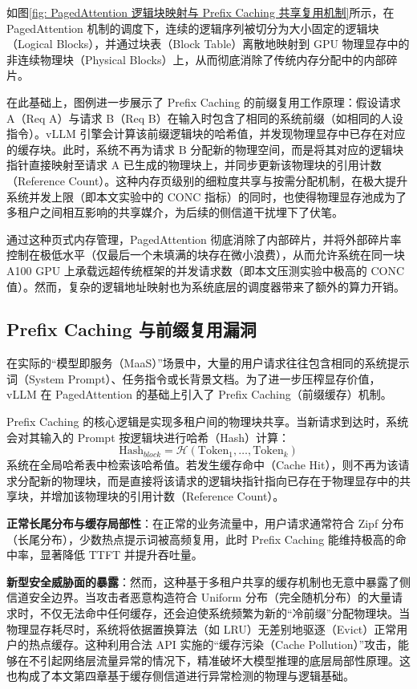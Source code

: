 \documentclass[master, vlined]{DissertUESTC}
\begin{document}
	如图\ref{fig: PagedAttention 逻辑块映射与 Prefix Caching 共享复用机制}所示，在 PagedAttention 机制的调度下，连续的逻辑序列被切分为大小固定的逻辑块（Logical Blocks），并通过块表（Block Table）离散地映射到 GPU 物理显存中的非连续物理块（Physical Blocks）上，从而彻底消除了传统内存分配中的内部碎片。

	在此基础上，图例进一步展示了 Prefix Caching 的前缀复用工作原理：假设请求 A（Req A）与请求 B（Req B）在输入时包含了相同的系统前缀（如相同的人设指令）。vLLM 引擎会计算该前缀逻辑块的哈希值，并发现物理显存中已存在对应的缓存块。此时，系统不再为请求 B 分配新的物理空间，而是将其对应的逻辑块指针直接映射至请求 A 已生成的物理块上，并同步更新该物理块的引用计数（Reference Count）。这种内存页级别的细粒度共享与按需分配机制，在极大提升系统并发上限（即本文实验中的 CONC 指标）的同时，也使得物理显存池成为了多租户之间相互影响的共享媒介，为后续的侧信道干扰埋下了伏笔。

	通过这种页式内存管理，PagedAttention 彻底消除了内部碎片，并将外部碎片率控制在极低水平（仅最后一个未填满的块存在微小浪费），从而允许系统在同一块 A100 GPU 上承载远超传统框架的并发请求数（即本文压测实验中极高的 CONC 值）。然而，复杂的逻辑地址映射也为系统底层的调度器带来了额外的算力开销。

	\subsection{Prefix Caching 与前缀复用漏洞}
	在实际的“模型即服务（MaaS）”场景中，大量的用户请求往往包含相同的系统提示词（System Prompt）、任务指令或长背景文档。为了进一步压榨显存价值，vLLM 在 PagedAttention 的基础上引入了 Prefix Caching（前缀缓存）机制。

	Prefix Caching 的核心逻辑是实现多租户间的物理块共享。当新请求到达时，系统会对其输入的 Prompt 按逻辑块进行哈希（Hash）计算：
	\begin{equation}
		\text{Hash}_{block} = \mathcal{H}(\text{Token}_1, \dots, \text{Token}_k)
	\end{equation}
	系统在全局哈希表中检索该哈希值。若发生缓存命中（Cache Hit），则不再为该请求分配新的物理块，而是直接将该请求的逻辑块指针指向已存在于物理显存中的共享块，并增加该物理块的引用计数（Reference Count）。

	\textbf{正常长尾分布与缓存局部性}：在正常的业务流量中，用户请求通常符合 Zipf 分布（长尾分布），少数热点提示词被高频复用，此时 Prefix Caching 能维持极高的命中率，显著降低 TTFT 并提升吞吐量。

	\textbf{新型安全威胁面的暴露}：然而，这种基于多租户共享的缓存机制也无意中暴露了侧信道安全边界。当攻击者恶意构造符合 Uniform 分布（完全随机分布）的大量请求时，不仅无法命中任何缓存，还会迫使系统频繁为新的“冷前缀”分配物理块。当物理显存耗尽时，系统将依据置换算法（如 LRU）无差别地驱逐（Evict）正常用户的热点缓存。这种利用合法 API 实施的“缓存污染（Cache Pollution）”攻击，能够在不引起网络层流量异常的情况下，精准破坏大模型推理的底层局部性原理。这也构成了本文第四章基于缓存侧信道进行异常检测的物理与逻辑基础。
\end{document}
